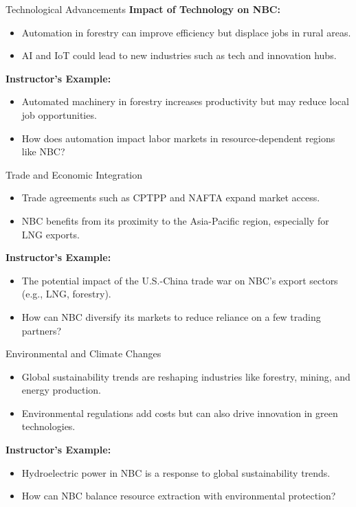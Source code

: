 \documentclass{beamer}
\begin{document}
\begin{frame}{Technological Advancements}
    \textbf{Impact of Technology on NBC:}
    \begin{itemize}
        \item Automation in forestry can improve efficiency but displace jobs in rural areas.
        \item AI and IoT could lead to new industries such as tech and innovation hubs.
    \end{itemize}
    \textbf{Instructor’s Example:}
    \begin{itemize}
        \item Automated machinery in forestry increases productivity but may reduce local job opportunities.
        \item How does automation impact labor markets in resource-dependent regions like NBC?
    \end{itemize}
\end{frame}

\begin{frame}{Trade and Economic Integration}
    \begin{itemize}
        \item Trade agreements such as CPTPP and NAFTA expand market access.
        \item NBC benefits from its proximity to the Asia-Pacific region, especially for LNG exports.
    \end{itemize}
    \textbf{Instructor’s Example:}
    \begin{itemize}
        \item The potential impact of the U.S.-China trade war on NBC’s export sectors (e.g., LNG, forestry).
        \item How can NBC diversify its markets to reduce reliance on a few trading partners?
    \end{itemize}
\end{frame}

\begin{frame}{Environmental and Climate Changes}
    \begin{itemize}
        \item Global sustainability trends are reshaping industries like forestry, mining, and energy production.
        \item Environmental regulations add costs but can also drive innovation in green technologies.
    \end{itemize}
    \textbf{Instructor’s Example:}
    \begin{itemize}
        \item Hydroelectric power in NBC is a response to global sustainability trends.
        \item How can NBC balance resource extraction with environmental protection?
    \end{itemize}
\end{frame}
\end{document}
